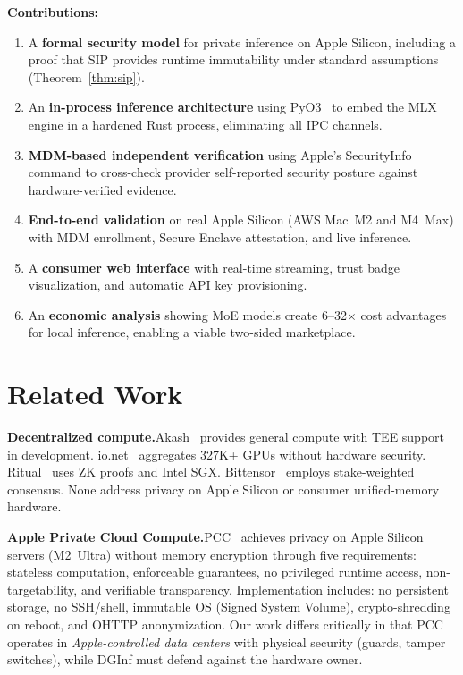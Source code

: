 \documentclass[10pt,twocolumn,letterpaper]{article}
\begin{document}
\textbf{Contributions:}
\begin{enumerate}[leftmargin=*,itemsep=2pt,topsep=2pt]
    \item A \textbf{formal security model} for private inference on Apple Silicon, including a proof that SIP provides runtime immutability under standard assumptions (Theorem~\ref{thm:sip}).
    \item An \textbf{in-process inference architecture} using PyO3~\cite{pyo3} to embed the MLX engine in a hardened Rust process, eliminating all IPC channels.
    \item \textbf{MDM-based independent verification} using Apple's SecurityInfo command to cross-check provider self-reported security posture against hardware-verified evidence.
    \item \textbf{End-to-end validation} on real Apple Silicon (AWS Mac~M2 and M4~Max) with MDM enrollment, Secure Enclave attestation, and live inference.
    \item A \textbf{consumer web interface} with real-time streaming, trust badge visualization, and automatic API key provisioning.
    \item An \textbf{economic analysis} showing MoE models create 6--32$\times$ cost advantages for local inference, enabling a viable two-sided marketplace.
\end{enumerate}

\section{Related Work}

\textbf{Decentralized compute.}\quad Akash~\cite{akash} provides general compute with TEE support in development. io.net~\cite{ionet} aggregates 327K+ GPUs without hardware security. Ritual~\cite{ritual} uses ZK proofs and Intel SGX. Bittensor~\cite{bittensor} employs stake-weighted consensus. None address privacy on Apple Silicon or consumer unified-memory hardware.

\textbf{Apple Private Cloud Compute.}\quad PCC~\cite{apple-pcc} achieves privacy on Apple Silicon servers (M2~Ultra) without memory encryption through five requirements: stateless computation, enforceable guarantees, no privileged runtime access, non-targetability, and verifiable transparency. Implementation includes: no persistent storage, no SSH/shell, immutable OS (Signed System Volume), crypto-shredding on reboot, and OHTTP anonymization. Our work differs critically in that PCC operates in \emph{Apple-controlled data centers} with physical security (guards, tamper switches), while DGInf must defend against the hardware owner.
\end{document}
